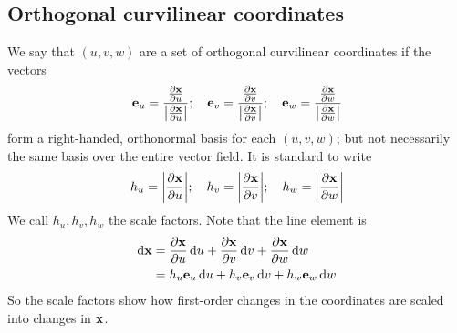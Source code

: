 \subsection{Orthogonal curvilinear coordinates}
We say that \((u, v, w)\) are a set of orthogonal curvilinear coordinates if the vectors
\[
	\vb e_u = \frac{\frac{\partial \vb x}{\partial u}}{\abs{\frac{\partial \vb x}{\partial u}}};\quad \vb e_v = \frac{\frac{\partial \vb x}{\partial v}}{\abs{\frac{\partial \vb x}{\partial v}}};\quad \vb e_w = \frac{\frac{\partial \vb x}{\partial w}}{\abs{\frac{\partial \vb x}{\partial w}}}
\]
form a right-handed, orthonormal basis for each \((u, v, w)\); but not necessarily the same basis over the entire vector field.
It is standard to write
\[
	h_u = \abs{\frac{\partial \vb x}{\partial u}};\quad h_v = \abs{\frac{\partial \vb x}{\partial v}};\quad h_w = \abs{\frac{\partial \vb x}{\partial w}}
\]
We call \(h_u, h_v, h_w\) the scale factors.
Note that the line element is
\begin{align*}
	\dd \vb x & = \frac{\partial \vb x}{\partial u}\dd{u} + \frac{\partial \vb x}{\partial v}\dd{v} + \frac{\partial \vb x}{\partial w} \dd{w} \\
	          & = h_u \vb e_u \dd{u} + h_v \vb e_v \dd{v} + h_w \vb e_w \dd{w}
\end{align*}
So the scale factors show how first-order changes in the coordinates are scaled into changes in \(\vb x\).

